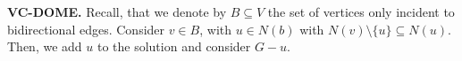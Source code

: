 
\textbf{VC-DOME.}
Recall, that we denote by $B\subseteq V$ the set of vertices only incident to bidirectional edges.
Consider $v\in B$, with $u \in N(b)$ with $N(v) \setminus \{u\} \subseteq N(u)$.
Then, we add $u$ to the solution and consider $G - u$.